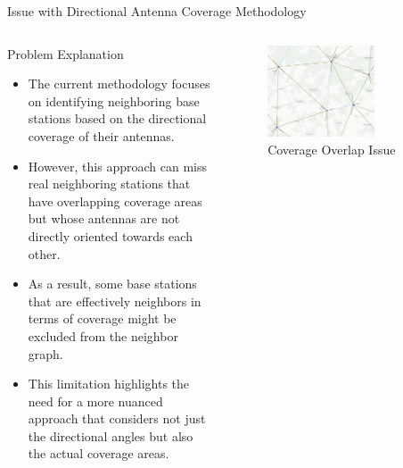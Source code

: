 \begin{frame}{Issue with Directional Antenna Coverage Methodology}
    \begin{columns}
        \begin{column}{0.5\textwidth}
            \begin{block}{Problem Explanation}
                \begin{itemize}
                    \item The current methodology focuses on identifying neighboring base stations based on the directional coverage of their antennas.
                    \item However, this approach can miss real neighboring stations that have overlapping coverage areas but whose antennas are not directly oriented towards each other.
                    \item As a result, some base stations that are effectively neighbors in terms of coverage might be excluded from the neighbor graph.
                    \item This limitation highlights the need for a more nuanced approach that considers not just the directional angles but also the actual coverage areas.
                \end{itemize}
            \end{block}
        \end{column}
        \begin{column}{0.5\textwidth}
            \begin{figure}
                \includegraphics[width=0.7\textwidth]{images/Altair/problem_with_azimuth.png}  
                \caption{Coverage Overlap Issue}
            \end{figure}
        \end{column}
    \end{columns}
\end{frame}

